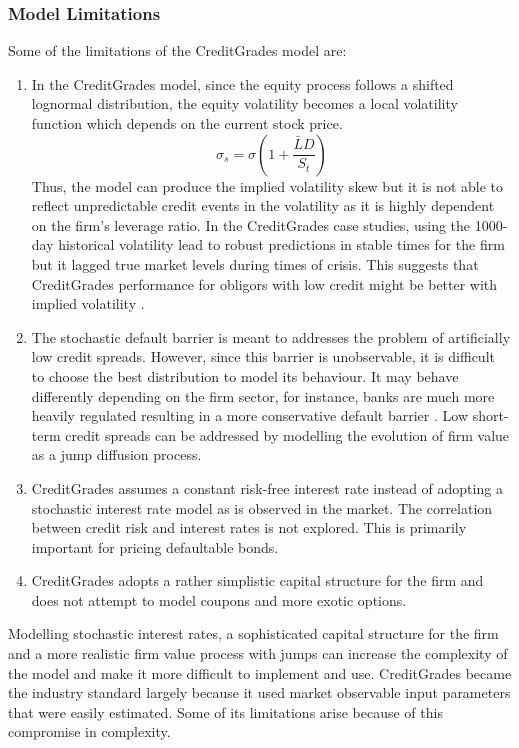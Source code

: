 \documentclass[11t,a4paper]{article}
\begin{document}
\subsubsection{Model Limitations}
Some of the limitations of the CreditGrades model are:
\begin{enumerate}
    \item In the CreditGrades model, since the equity process follows a shifted lognormal distribution, the equity volatility becomes a local volatility function which depends on the current stock price. 
    \[\sigma_s = \sigma (1+\frac{\bar{L}{D}}{S_t})\]
    Thus, the model can produce the implied volatility skew but it is not able to reflect unpredictable credit events in the volatility as it is highly dependent on the firm's leverage ratio. In the CreditGrades case studies, using the 1000-day historical volatility lead to robust predictions in stable times for the firm but it lagged true market levels during times of crisis. This suggests that CreditGrades performance for obligors with low credit might be better with implied volatility \cite{cgvol}. 
    \item The stochastic default barrier is meant to addresses the problem of artificially low credit spreads. However, since this barrier is unobservable, it is difficult to choose the best distribution to model its behaviour. It may behave differently depending on the firm sector, for instance, banks are much more heavily regulated resulting in a more conservative default barrier \cite{levycg}. Low short-term credit spreads can be addressed by modelling the evolution of firm value as a jump diffusion process. 
    \item CreditGrades assumes a constant risk-free interest rate instead of adopting a stochastic interest rate model as is observed in the market. The correlation between credit risk and interest rates is not explored. This is primarily important for pricing defaultable bonds. 
    \item CreditGrades adopts a rather simplistic capital structure for the firm and does not attempt to model coupons and more exotic options. 
\end{enumerate}
Modelling stochastic interest rates, a sophisticated capital structure for the firm and a more realistic firm value process with jumps can increase the complexity of the model and make it more difficult to implement and use. CreditGrades became the industry standard largely because it used market observable input parameters that were easily estimated. Some of its limitations arise because of this compromise in complexity. 
\end{document}
